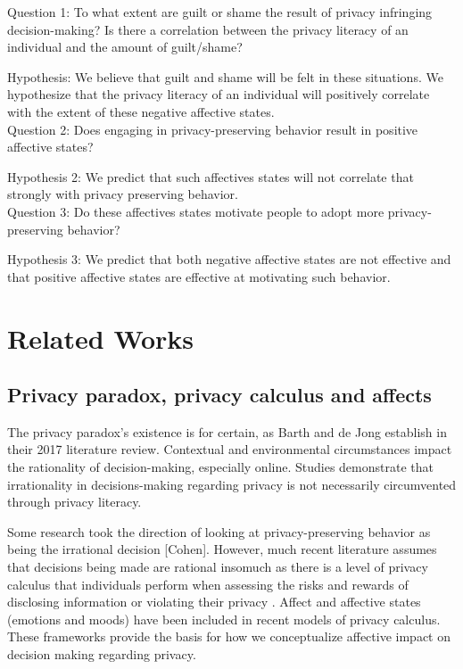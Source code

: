 \documentclass[acmtog]{acmart}
\begin{document}
Question 1: To what extent are guilt or shame the result of privacy infringing decision-making? Is there a correlation between the privacy literacy of an individual and the amount of guilt/shame?

Hypothesis: We believe that guilt and shame will be felt in these situations. We hypothesize that the privacy literacy of an individual will positively correlate with the extent of these negative affective states. \\

Question 2: Does engaging in privacy-preserving behavior result in positive affective states?

Hypothesis 2: We predict that such affectives states will not correlate that strongly with privacy preserving behavior. \\

Question 3: Do these affectives states motivate people to adopt more privacy-preserving behavior?

Hypothesis 3: We predict that both negative affective states are not effective and that positive affective states are effective at motivating such behavior.


\section{Related Works}
\subsection{Privacy paradox, privacy calculus and affects}
The privacy paradox’s existence is for certain, as Barth and de Jong establish in their 2017 literature review. Contextual and environmental circumstances impact the rationality of decision-making, especially online. Studies demonstrate that irrationality in decisions-making regarding privacy is not necessarily circumvented through privacy literacy. \cite{Barth2017}

Some research took the direction of looking at privacy-preserving behavior as being the irrational decision [Cohen]. However, much recent literature assumes that decisions being made are rational insomuch as there is a level of privacy calculus that individuals perform when assessing the risks and rewards of disclosing information or violating their privacy \cite{Kehr2015}\cite{Jian2013}. Affect and affective states (emotions and moods) have been included in recent models of privacy calculus. These frameworks provide the basis for how we conceptualize affective impact on decision making regarding privacy.
\end{document}
